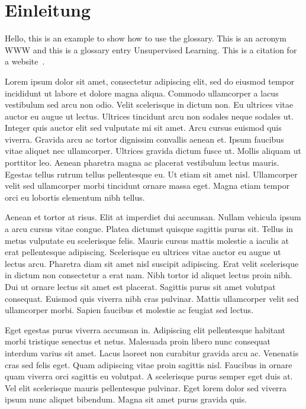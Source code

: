 \chapter{Einleitung}

Hello, this is an example to show how to use the glossary. This is an acronym \gls{WWW} and this is a
glossary entry \gls{Unsupervised Learning}. This is a citation for a website~\cite{website:this_repo}.


Lorem ipsum dolor sit amet, consectetur adipiscing elit, sed do eiusmod tempor incididunt ut labore et dolore magna aliqua. Commodo ullamcorper a lacus vestibulum sed arcu non odio. Velit scelerisque in dictum non. Eu ultrices vitae auctor eu augue ut lectus. Ultrices tincidunt arcu non sodales neque sodales ut. Integer quis auctor elit sed vulputate mi sit amet. Arcu cursus euismod quis viverra. Gravida arcu ac tortor dignissim convallis aenean et. Ipsum faucibus vitae aliquet nec ullamcorper. Ultrices gravida dictum fusce ut. Mollis aliquam ut porttitor leo. Aenean pharetra magna ac placerat vestibulum lectus mauris. Egestas tellus rutrum tellus pellentesque eu. Ut etiam sit amet nisl. Ullamcorper velit sed ullamcorper morbi tincidunt ornare massa eget. Magna etiam tempor orci eu lobortis elementum nibh tellus.

Aenean et tortor at risus. Elit at imperdiet dui accumsan. Nullam vehicula ipsum a arcu cursus vitae congue. Platea dictumst quisque sagittis purus sit. Tellus in metus vulputate eu scelerisque felis. Mauris cursus mattis molestie a iaculis at erat pellentesque adipiscing. Scelerisque eu ultrices vitae auctor eu augue ut lectus arcu. Pharetra diam sit amet nisl suscipit adipiscing. Erat velit scelerisque in dictum non consectetur a erat nam. Nibh tortor id aliquet lectus proin nibh. Dui ut ornare lectus sit amet est placerat. Sagittis purus sit amet volutpat consequat. Euismod quis viverra nibh cras pulvinar. Mattis ullamcorper velit sed ullamcorper morbi. Sapien faucibus et molestie ac feugiat sed lectus.

Eget egestas purus viverra accumsan in. Adipiscing elit pellentesque habitant morbi tristique senectus et netus. Malesuada proin libero nunc consequat interdum varius sit amet. Lacus laoreet non curabitur gravida arcu ac. Venenatis cras sed felis eget. Quam adipiscing vitae proin sagittis nisl. Faucibus in ornare quam viverra orci sagittis eu volutpat. A scelerisque purus semper eget duis at. Vel elit scelerisque mauris pellentesque pulvinar. Eget lorem dolor sed viverra ipsum nunc aliquet bibendum. Magna sit amet purus gravida quis.

